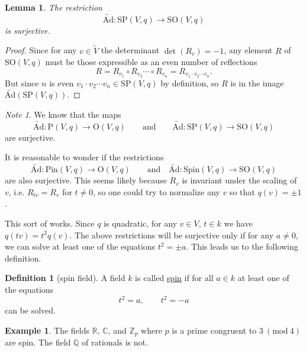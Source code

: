 \documentclass[a4paper,10pt]{scrreprt}
\newcommand{\R}{\mathbb{R}}
\newcommand{\C}{\mathbb{C}}
\newcommand{\Z}{\mathbb{Z}}
\newcommand{\Q}{\mathbb{Q}}
\newcommand{\defn}[1]{\ul{#1}}
\newcommand{\tAd}{\widetilde{\mathrm{Ad}}}
\newcommand{\Pin}{\mathrm{Pin}}
\newcommand{\Spin}{\mathrm{Spin}}
\newcommand{\Or}{\mathrm{O}}
\newcommand{\SO}{\mathrm{SO}}
\newcommand{\PP}{\mathrm{P}}
\newcommand{\SP}{\mathrm{SP}}
\theoremstyle{definition}
\newtheorem{definition}{Definition}[section]
\newtheorem{example}{Example}[section]
\theoremstyle{plain}
\newtheorem{lemma}{Lemma}[section]
\theoremstyle{remark}
\newtheorem{note}{Note}[section]
\begin{document}
\begin{lemma}
  The restriction 
  \begin{equation*}
    \tAd\colon \SP(V, q) \to \SO(V, q)
  \end{equation*}
  is surjective.
\end{lemma}
\begin{proof}
  Since for any $v \in \tilde{V}$ the determinant $\det(R_{v}) = -1$, any element $R$ of $\SO(V, q)$ must be those expressible as an even number of reflections 
  \begin{equation*}
    R = R_{v_{1}} \circ R_{v_{2}} \cdots \circ R_{v_{n}} = R_{v_{1} \cdot v_{2} \cdots v_{n}}.
  \end{equation*}
  But since $n$ is even $v_{1} \cdot v_{2} \cdots v_{n} \in \SP(V, q)$ by definition, so $R$ is in the image $\tAd(\SP(V, q))$.
\end{proof}

\begin{note}
  We know that the maps
  \begin{equation*}
    \tAd\colon \PP(V, q) \to \Or(V, q)\qquad\text{and}\qquad \tAd\colon \SP(V, q) \to \SO(V, q)
  \end{equation*}
  are surjective.

  It is reasonable to wonder if the restrictions
  \begin{equation*}
    \tAd\colon \Pin(V, q) \to \Or(V, q)\qquad\text{and}\quad \tAd\colon \Spin(V, q) \to \SO(V, q)
  \end{equation*}
  are also surjective. This seems likely because $R_{v}$ is invariant under the scaling of $v$, i.e. $R_{tv} = R_{v}$ for $t \neq 0$, so one could try to normalize any $v$ so that $q(v) = \pm 1$. 

  This sort of works. Since $q$ is quadratic, for any $v \in V$, $t \in k$ we have $q(tv) = t^2 q(v)$. The above restrictions will be surjective only if for any $a \neq 0$, we can solve at least one of the equations $t^{2} = \pm a$. This leads us to the following definition.
\end{note} 
\begin{definition}[spin field]
  \label{def:spinfield}
  A field $k$ is called \defn{spin} if for all $a \in k$ at least one of the equations
  \begin{equation*}
    t^{2} = a,\qquad t^{2} = -a
  \end{equation*}
  can be solved.
\end{definition}
\begin{example}
  The fields $\R$, $\C$, and $\Z_{p}$ where $p$ is a prime congruent to $3\ (\mathrm{mod}\ 4)$ are spin. The field $\Q$ of rationals is not.
\end{example}
\end{document}
